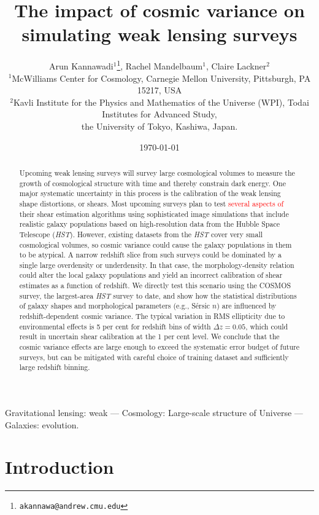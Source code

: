 \documentclass[twocolumn,useAMS,usenatbib]{mn2e}
\title[Cosmic variance in simulations]{The impact of cosmic variance on simulating weak lensing surveys}
\author[Kannawadi et al.]
{Arun Kannawadi$^1$\thanks{\tt akannawa@andrew.cmu.edu}, 
Rachel Mandelbaum$^1$,
Claire Lackner$^2$
\\$^1$McWilliams Center for Cosmology, Carnegie Mellon University, Pittsburgh, PA 15217, USA
\\$^2$Kavli Institute for the Physics and Mathematics of the Universe (WPI), Todai Institutes for Advanced Study,\\ the University of Tokyo, Kashiwa, Japan.
}
\date{\today}
\newcommand{\rachel}[1]{{\textcolor{red}{#1}}}
\begin{document}

\maketitle

\begin{abstract}
Upcoming weak lensing surveys will survey large cosmological volumes to measure the growth of cosmological structure with time and
thereby constrain dark energy.  One major systematic uncertainty in
this process is the calibration of the weak lensing shape distortions,
or shears.  Most upcoming surveys plan to test \rachel{several aspects of} their shear
estimation algorithms using sophisticated image simulations that
include 
realistic galaxy populations based on high-resolution data from the
Hubble Space Telescope ({\em HST}).  However, existing datasets
from the {\em HST} cover very small cosmological volumes, so cosmic variance could cause the galaxy populations in them
to be atypical. A narrow redshift slice from such surveys could be dominated by a single large overdensity or underdensity.  In that case, the
morphology-density relation could alter the local galaxy
populations and yield an incorrect calibration of shear estimates as a function of redshift. We directly test this scenario using the COSMOS survey, the largest-area {\em HST} survey to date, and show how the
statistical distributions of galaxy shapes and
morphological parameters (e.g., S\'{e}rsic $n$)
are influenced by redshift-dependent cosmic variance. 
The typical variation in RMS ellipticity due to environmental effects is 5 per cent for redshift bins of width $\Delta z=0.05$, which could result in uncertain shear calibration at the 1 per cent level. We conclude that the cosmic variance effects are large enough to exceed the systematic error budget of future surveys, but can be mitigated with careful choice of training dataset and sufficiently large redshift binning.
\end{abstract}

\begin{keywords}
 Gravitational lensing: weak --- Cosmology: Large-scale structure of Universe --- Galaxies: evolution.
\end{keywords}


\section{Introduction}
\label{S:intro}
\end{document}
